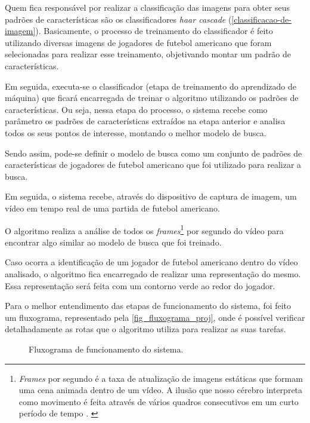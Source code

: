 Quem fica responsável por realizar a classificação das imagens para obter seus padrões de características são os classificadores \textit{haar cascade} (\autoref{classificacao-de-imagem}). Basicamente, o processo de treinamento do classificador é feito utilizando diversas imagens de jogadores de futebol americano que foram selecionadas para realizar esse treinamento, objetivando montar um padrão de características.

Em seguida, executa-se o classificador (etapa de treinamento do aprendizado de máquina) que ficará encarregada de treinar o algoritmo utilizando os padrões de características. Ou seja, nessa etapa do processo, o sistema recebe como parâmetro os padrões de características extraídos na etapa anterior e analisa todos os seus pontos de interesse, montando o melhor modelo de busca.

Sendo assim, pode-se definir o modelo de busca como um conjunto de padrões de características de jogadores de futebol americano que foi utilizado para realizar a busca. 

Em seguida, o sistema recebe, através do dispositivo de captura de imagem, um vídeo em tempo real de uma partida de futebol americano.

O algoritmo realiza a análise de todos os \textit{frames}\footnote{\textit{Frames} por segundo é a taxa de atualização de imagens estáticas que formam uma cena animada dentro de um vídeo. A ilusão que nosso cérebro interpreta como movimento é feita através de vários quadros consecutivos em um curto período de tempo \cite{FRAMES2011}. \label{frames-por-segundo}} por segundo do vídeo para encontrar algo similar ao modelo de busca que foi treinado.

Caso ocorra a identificação de um jogador de futebol americano dentro do vídeo analisado, o algoritmo fica encarregado de realizar uma representação do mesmo. Essa representação será feita com um contorno verde ao redor do jogador.

Para o melhor entendimento das etapas de funcionamento do sistema, foi feito um fluxograma, representado pela \autoref{fig_fluxograma_proj}, onde é possível verificar detalhadamente as rotas que o algoritmo utiliza para realizar as suas tarefas.

\clearpage

\begin{figure}[h]
	\caption{\label{fig_fluxograma_proj}Fluxograma de funcionamento do sistema.}
	\begin{center}
	\end{center}
	\centering {}
\end{figure}